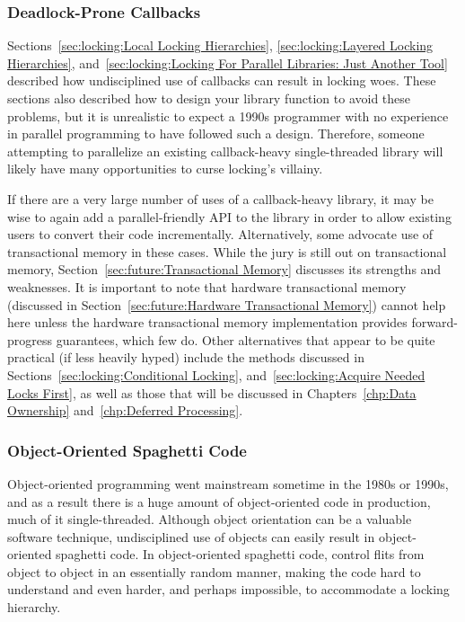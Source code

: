 \subsubsection{Deadlock-Prone Callbacks}
\label{sec:locking:Deadlock-Prone Callbacks}

Sections~\ref{sec:locking:Local Locking Hierarchies},
\ref{sec:locking:Layered Locking Hierarchies},
and~\ref{sec:locking:Locking For Parallel Libraries: Just Another Tool}
described how undisciplined use of callbacks can result in locking
woes.
These sections also described how to design your library function to
avoid these problems, but it is unrealistic to expect a 1990s programmer
with no experience in parallel programming to have followed such a design.
Therefore, someone attempting to parallelize an existing callback-heavy
single-threaded library will likely have many opportunities to curse
locking's villainy.

If there are a very large number of uses of a callback-heavy library,
it may be wise to again add a parallel-friendly API to the library in
order to allow existing users to convert their code incrementally.
Alternatively, some advocate use of transactional memory in these cases.
While the jury is still out on transactional memory,
Section~\ref{sec:future:Transactional Memory} discusses its strengths and
weaknesses.
It is important to note that hardware transactional memory
(discussed in
Section~\ref{sec:future:Hardware Transactional Memory})
cannot help here unless the hardware transactional memory implementation
provides forward-progress guarantees, which few do.
Other alternatives that appear to be quite practical (if less heavily
hyped) include the methods discussed in
Sections~\ref{sec:locking:Conditional Locking},
and~\ref{sec:locking:Acquire Needed Locks First},
as well as those that will be discussed in
Chapters~\ref{chp:Data Ownership}
and~\ref{chp:Deferred Processing}.

\subsubsection{Object-Oriented Spaghetti Code}
\label{sec:locking:Object-Oriented Spaghetti Code}

Object-oriented programming went mainstream sometime in the 1980s or
1990s, and as a result there is a huge amount of object-oriented code
in production, much of it single-threaded.
Although object orientation can be a valuable software technique,
undisciplined use of objects can easily result in object-oriented
spaghetti code.
In object-oriented spaghetti code, control flits from object to object
in an essentially random manner, making the code hard to understand
and even harder, and perhaps impossible, to accommodate a locking hierarchy.

